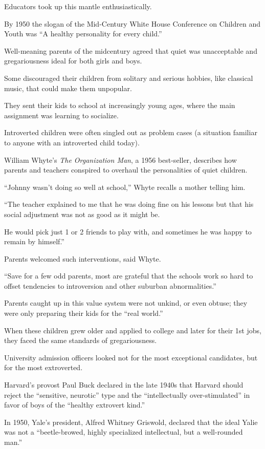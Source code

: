 \documentclass[oneside]{article}
\numberwithin{equation}{section}
\begin{document}
Educators took up this mantle enthusiastically.

By 1950 the slogan of the Mid-Century White House Conference on Children and Youth was ``A healthy personality for every child.''

%
Well-meaning parents of the midcentury agreed that quiet was unacceptable and gregariousness ideal for both girls and boys.

Some discouraged their children from solitary and serious hobbies, like classical music, that could make them unpopular.

They sent their kids to school at increasingly young ages, where the main assignment was learning to socialize.

Introverted children were often singled out as problem cases (a situation familiar to anyone with an introverted child today).

%
William Whyte's \textit{The Organization Man}, a 1956 best-seller, describes how parents and teachers conspired to overhaul the personalities of quiet children.

``Johnny wasn't doing so well at school,'' Whyte recalls a mother telling him.

``The teacher explained to me that he was doing fine on his lessons but that his social adjustment was not as good as it might be.

He would pick just 1 or 2 friends to play with, and sometimes he was happy to remain by himself.''

Parents welcomed such interventions, said Whyte.

``Save for a few odd parents, most are grateful that the schools work so hard to offset tendencies to introversion and other suburban abnormalities.''

%
Parents caught up in this value system were not unkind, or even obtuse; they were only preparing their kids for the ``real world.''

When these children grew older and applied to college and later for their 1st jobs, they faced the same standards of gregariousness.

University admission officers looked not for the most exceptional candidates, but for the most extroverted.

Harvard's provost Paul Buck declared in the late 1940s that Harvard should reject the ``sensitive, neurotic'' type and the ``intellectually over-stimulated'' in favor of boys of the ``healthy extrovert kind.''

In 1950, Yale's president, Alfred Whitney Griswold, declared that the ideal Yalie was not a ``beetle-browed, highly specialized intellectual, but a well-rounded man.''
\end{document}

